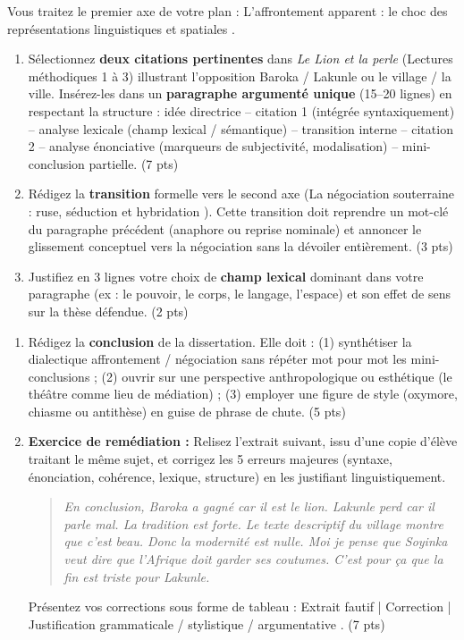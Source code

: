 \documentclass[11pt]{article}
\begin{document}
\begin{exercice}
Vous traitez le premier axe de votre plan : \og L'affrontement apparent : le choc des représentations linguistiques et spatiales \fg{}.

\begin{enumerate}
    \item Sélectionnez \textbf{deux citations pertinentes} dans \textit{Le Lion et la perle} (Lectures méthodiques 1 à 3) illustrant l'opposition Baroka / Lakunle ou le village / la ville. Insérez-les dans un \textbf{paragraphe argumenté unique} (15--20 lignes) en respectant la structure : idée directrice -- citation 1 (intégrée syntaxiquement) -- analyse lexicale (champ lexical / sémantique) -- transition interne -- citation 2 -- analyse énonciative (marqueurs de subjectivité, modalisation) -- mini-conclusion partielle. (7 pts)
    \item Rédigez la \textbf{transition} formelle vers le second axe (\og La négociation souterraine : ruse, séduction et hybridation \fg{}). Cette transition doit reprendre un mot-clé du paragraphe précédent (anaphore ou reprise nominale) et annoncer le glissement conceptuel vers la \og négociation \fg{} sans la dévoiler entièrement. (3 pts)
    \item Justifiez en 3 lignes votre choix de \textbf{champ lexical} dominant dans votre paragraphe (ex : le pouvoir, le corps, le langage, l'espace) et son effet de sens sur la thèse défendue. (2 pts)
\end{enumerate}
\end{exercice}

\begin{exercice}
\begin{enumerate}
    \item Rédigez la \textbf{conclusion} de la dissertation. Elle doit : (1) synthétiser la dialectique \og affrontement / négociation \fg{} sans répéter mot pour mot les mini-conclusions ; (2) ouvrir sur une perspective anthropologique ou esthétique (le théâtre comme lieu de médiation) ; (3) employer une figure de style (oxymore, chiasme ou antithèse) en guise de phrase de chute. (5 pts)
    \item \textbf{Exercice de remédiation :} Relisez l'extrait suivant, issu d'une copie d'élève traitant le même sujet, et corrigez les 5 erreurs majeures (syntaxe, énonciation, cohérence, lexique, structure) en les justifiant linguistiquement.
    \begin{quote}
    \og \textit{En conclusion, Baroka a gagné car il est le lion. Lakunle perd car il parle mal. La tradition est forte. Le texte descriptif du village montre que c'est beau. Donc la modernité est nulle. Moi je pense que Soyinka veut dire que l'Afrique doit garder ses coutumes. C'est pour ça que la fin est triste pour Lakunle.} \fg{}
    \end{quote}
    Présentez vos corrections sous forme de tableau : \og Extrait fautif \fg{} | \og Correction \fg{} | \og Justification grammaticale / stylistique / argumentative \fg{}. (7 pts)
\end{enumerate}
\end{exercice}
\end{document}

